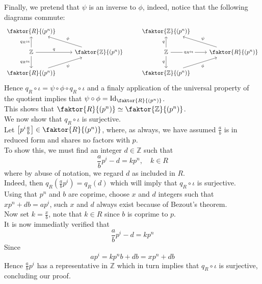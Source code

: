 \documentclass[11pt, a4paper]{article}
\begin{document}
Finally, we pretend that $\psi$ is an inverse to $\phi$, indeed, notice that the following diagrams commute:
\[\begin{tikzcd}
	{\faktor {R}{(p^n)}} && {\faktor {\mathbb{Z}}{(p^n)}} \\
	{\mathbb{Z}} & {\faktor{\mathbb{Z}}{(p^n)}} & {\mathbb{Z}} & {\faktor {R}{(p^n)}} \\
	{\faktor {R}{(p^n)}} && {\faktor {\mathbb{Z}}{(p^n)}}
	\arrow["{q_R\circ\iota}"', from=2-1, to=3-1]
	\arrow["q", from=2-1, to=2-2]
	\arrow["{q_R\circ \iota}", from=2-1, to=1-1]
	\arrow["\phi"', from=2-2, to=1-1]
	\arrow["\psi"', from=3-1, to=2-2]
	\arrow["q"', from=2-3, to=3-3]
	\arrow["q", from=2-3, to=1-3]
	\arrow["\phi"', from=3-3, to=2-4]
	\arrow["\psi"', from=2-4, to=1-3]
	\arrow["{q_R\circ\iota}"{description}, from=2-3, to=2-4]
\end{tikzcd}\]
Hence $q_R\circ\iota= \psi\circ\phi\circ q_R\circ\iota$ and a finaly application of the universal property of the quotient implies that $\psi\circ\phi= \id_{\faktor { R} { ( p^{n}) } } $.\\
This shows that $ \faktor { R} { ( p^{n} )}\simeq \faktor { \mathbb{Z}} { ( p^{n}) }  $.\\



We now show that $q_R \circ \iota$ is surjective.\\
Let $ \left[ p^{i}\frac{a}{b} \right]\in \faktor { R} { ( p^{n}) }  $, where, as always, we have assumed $\frac{a}{b}$ is in reduced form and shares no factors with $p$.\\
To show this, we must find an integer $d \in \mathbb{Z}$ such that 
\[ 
\frac{a}{b}p^{i}- d = k p^{n}, \quad k \in R 
\]
where by abuse of notation, we regard $d$ as included in $ R$.\\
Indeed, then $ q_R( \frac{a}{b}p^{i} )= q_R( d) $ which will imply that $q_R \circ \iota$ is surjective.\\
Using that $p^{n}$ and $b$ are coprime, choose $x$ and $d$ integers such that $xp^{n}+ db= ap^{i}$, such $x$ and $d$ always exist because of Bezout's theorem.\\
Now set $k= \frac{x}{b}$, note that $k \in R$ since $b$ is coprime to $p$.\\
It is now immediatly verified that 
\[ 
\frac{a}{b}p^{i}-d = kp^{n}
\]
Since
\[ 
ap^{i}= kp^{n} b + db = xp^{n} + db 
\]
Hence $\frac{a}{b}p^{i}$ has a representative in $ \mathbb{Z}$ which in turn implies that $q_R \circ\iota$ is surjective, concluding our proof.
\end{document}
